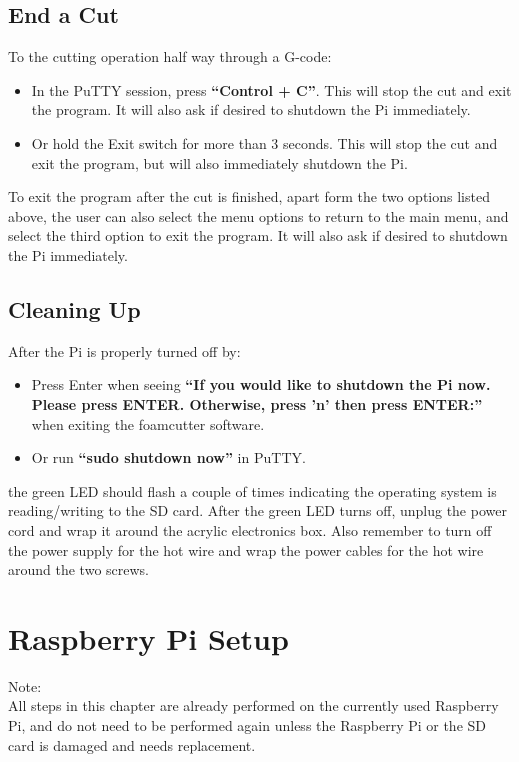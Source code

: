 \documentclass[titlepage,12pt,letter]{report}
\numberwithin{equation}{chapter}
\begin{document}
\section{End a Cut}
To the cutting operation half way through a G-code:
\begin{itemize}[itemsep = 5pt,topsep=0pt]
	\item In the PuTTY session, press \textbf{``Control + C''}. This will stop the cut and exit the program. It will also ask if desired to shutdown the Pi immediately.
	\item Or hold the Exit switch for more than 3 seconds. This will stop the cut and exit the program, but will also immediately shutdown the Pi.
\end{itemize}

To exit the program after the cut is finished, apart form the two options listed above, the user can also select the menu options to return to the main menu, and select the third option to exit the program. It will also ask if desired to shutdown the Pi immediately.

\section{Cleaning Up}
After the Pi is properly turned off by:
\begin{itemize}[itemsep = 5pt,topsep=0pt]
	\item Press Enter when seeing \textbf{``If you would like to shutdown the Pi now. Please press ENTER. Otherwise, press 'n' then press ENTER:''} when exiting the foamcutter software.
	\item Or run \textbf{``sudo shutdown now''} in PuTTY.
\end{itemize}
the green LED should flash a couple of times indicating the operating system is reading/writing to the SD card. After the green LED turns off, unplug the power cord and wrap it around the acrylic electronics box. Also remember to turn off the power supply for the hot wire and wrap the power cables for the hot wire around the two screws. 


\newpage
\chapter{Raspberry Pi Setup}
\begin{tcolorbox}
	{\large
		Note: \\
		All steps in this chapter are already performed on the currently used Raspberry Pi, and do not need to be performed again unless the Raspberry Pi or the SD card is damaged and needs replacement. 
	}
\end{tcolorbox}
\end{document}
